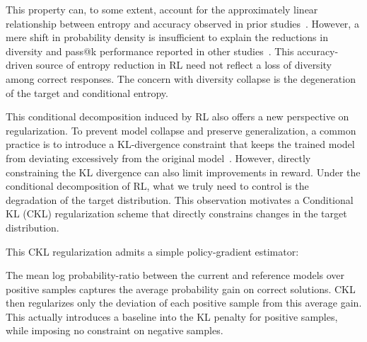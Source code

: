 This property can, to some extent, account for the approximately linear relationship between entropy and accuracy observed in prior studies~\citep{cui_entropy_2025}. However, a mere shift in probability density is insufficient to explain the reductions in diversity and pass@k performance reported in other studies~\citep{yue_does_2025, tajwar_maximum_2026}. This accuracy-driven source of entropy reduction in RL need not reflect a loss of diversity among correct responses. The concern with diversity collapse is the degeneration of the target and conditional entropy.


This conditional decomposition induced by RL also offers a new perspective on regularization. To prevent model collapse and preserve generalization, a common practice is to introduce a KL-divergence constraint that keeps the trained model from deviating excessively from the original model~\citep{schulman_trust_2017, schulman_proximal_2017, ouyang_training_2022}. However, directly constraining the KL divergence can also limit improvements in reward. Under the conditional decomposition of RL, what we truly need to control is the degradation of the target distribution. This observation motivates a Conditional KL (CKL) regularization scheme that directly constrains changes in the target distribution.

This CKL regularization admits a simple policy-gradient estimator:

\begin{insight}
The mean log probability-ratio between the current and reference models over positive samples captures the average probability gain on correct solutions. CKL then regularizes only the deviation of each positive sample from this average gain. This actually introduces a baseline into the KL penalty for positive samples, while imposing no constraint on negative samples.
\end{insight}

